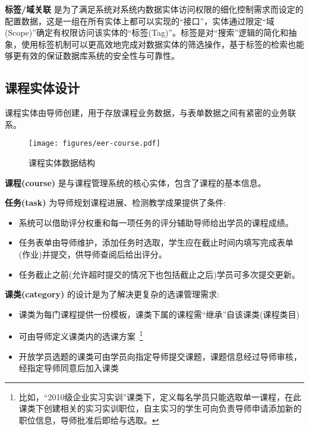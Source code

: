 \textbf{标签/域关联} 是为了满足系统对系统内数据实体访问权限的细化控制需求而设定的配置数据，这是一组在所有实体上都可以实现的“接口”，实体通过限定“域(Scope)”确定有权限访问该实体的“标签(Tag)”。标签是对“搜索”逻辑的简化和抽象，使用标签机制可以更高效地完成对数据实体的筛选操作，基于标签的检索也能够更有效的保证数据库系统的安全性与可靠性。

\newpage

\subsection{课程实体设计}

课程实体由导师创建，用于存放课程业务数据，与表单数据之间有紧密的业务联系。

\begin{figure}[!h]
  \begin{center}
    \texttt{[image: figures/eer-course.pdf]}
    \caption{课程实体数据结构\label{DatabaseEntityCourse}}
  \end{center}
\end{figure}

\textbf{课程(course)} 是与课程管理系统的核心实体，包含了课程的基本信息。

\textbf{任务(task)} 为导师规划课程进展、检测教学成果提供了条件:

\begin{itemize}
  \item 系统可以借助评分权重和每一项任务的评分辅助导师给出学员的课程成绩。

  \item 任务表单由导师维护，添加任务时选取，学生应在截止时间内填写完成表单(作业)并提交，供导师查阅后给出评分。

  \item 任务截止之前(允许超时提交的情况下也包括截止之后)学员可多次提交更新。
\end{itemize}

\textbf{课类(category)} 的设计是为了解决更复杂的选课管理需求:

\begin{itemize}
  \item 课类为每门课程提供一份模板，课类下属的课程需“继承”自该课类(课程类目)
  \item 可由导师定义课类内的选课方案~\footnote{比如，“2010级企业实习实训”课类下，定义每名学员只能选取单一课程，在此课类下创建相关的实习实训职位，自主实习的学生可向负责导师申请添加新的职位信息，导师批准后即给与选取。}
  \item 开放学员选题的课类可由学员向指定导师提交课题，课题信息经过导师审核，经指定导师同意后加入课类
\end{itemize}

